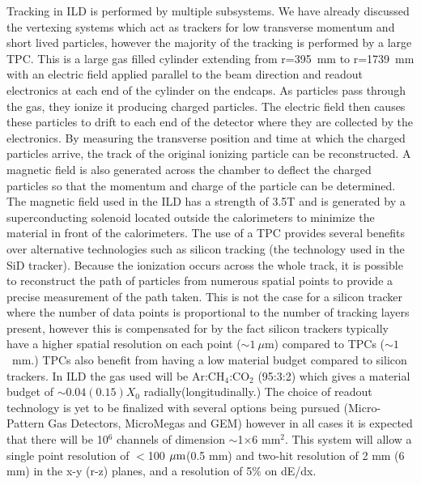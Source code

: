Tracking in \ac{ILD} is performed by multiple subsystems. We have already discussed the vertexing systems which act as trackers for low transverse momentum and short lived particles, however the majority of the tracking is performed by a large \ac{TPC}.  This is a large gas filled cylinder extending from r=395~mm to r=1739~mm with an electric field applied parallel to the beam direction and readout electronics at each end of the cylinder on the endcaps. As particles pass through the gas, they ionize it producing charged particles. The electric field then causes these particles to drift to each end of the detector where they are collected by the electronics. By measuring the transverse position and time at which the charged particles arrive, the track of the original ionizing particle can be reconstructed. A magnetic field is also generated across the chamber to deflect the charged particles so that the momentum and charge of the particle can be determined. The magnetic field used in the ILD has a strength of 3.5T and is generated by a superconducting solenoid located outside the calorimeters to minimize the material in front of the calorimeters. The use of a \ac{TPC} provides several benefits over alternative technologies such as silicon tracking (the technology used in the \ac{SiD} tracker). Because the ionization occurs across the whole track, it is possible to reconstruct the path of particles from numerous spatial points to provide a precise measurement of the path taken. This is not the case for a silicon tracker where the number of data points is proportional to the number of tracking layers present, however this is compensated for by the fact silicon trackers typically have a higher spatial resolution on each point ($\sim 1~\mu$m) compared to TPCs ($\sim 1$~mm.) TPCs also benefit from having a low material budget compared to silicon trackers. In \ac{ILD} the gas used will be Ar:CH$_{4}$:CO$_{2}$ (95:3:2) which gives a material budget of $\sim 0.04(0.15)X_0$ radially(longitudinally.) The choice of readout technology is yet to be finalized with several options being pursued (Micro-Pattern Gas Detectors, MicroMegas\cite{Giomataris:1995fq} and GEM\cite{Sauli:1997qp}) however in all cases it is expected that there will be 10${^{6}}$ channels of dimension $\sim$1$\times$6 mm$^{2}$. This system will allow a single point resolution of $<$100$~\mu\textrm{m}$(0.5 mm) and two-hit resolution of 2 mm (6 mm)  in the x-y (r-z) planes, and a resolution of 5$\%$ on dE/dx.

